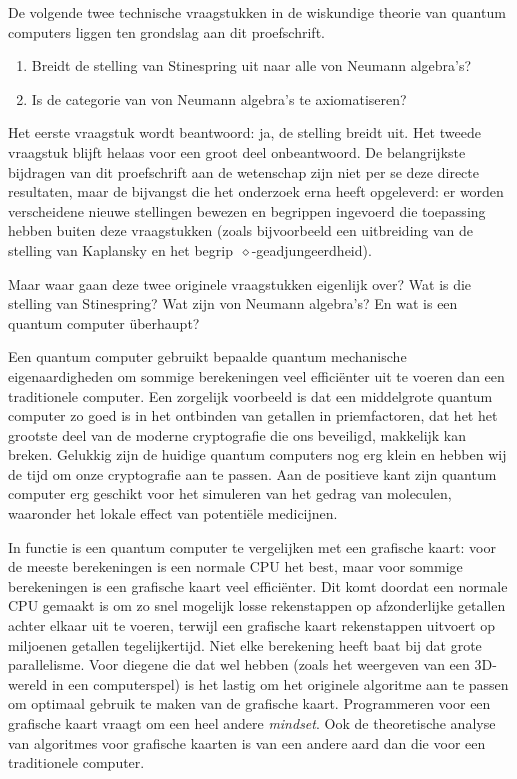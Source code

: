     
De volgende twee technische vraagstukken
    in de wiskundige theorie van quantum computers
    liggen ten grondslag aan dit proefschrift.
\begin{enumerate}
\item 
    Breidt de stelling van Stinespring uit naar
        alle von Neumann algebra's?
\item
    Is de categorie van von Neumann algebra's te axiomatiseren?
\end{enumerate}
Het eerste vraagstuk wordt beantwoord: ja, de stelling breidt uit.
Het tweede vraagstuk blijft helaas voor een groot deel onbeantwoord.
De belangrijkste bijdragen van dit proefschrift aan de wetenschap
    zijn niet per se deze directe resultaten,
    maar de bijvangst die het onderzoek erna heeft opgeleverd:
    er worden verscheidene nieuwe stellingen bewezen
        en begrippen ingevoerd
    die toepassing hebben buiten deze vraagstukken
    (zoals bijvoorbeeld een uitbreiding van de stelling
        van Kaplansky en het begrip~$\diamond$-geadjungeerdheid).

Maar waar gaan deze twee originele vraagstukken eigenlijk over?
Wat is die stelling van Stinespring?
Wat zijn von Neumann algebra's?
En wat is een quantum computer \"uberhaupt?

Een quantum computer gebruikt
       bepaalde quantum mechanische eigenaardigheden
    om sommige berekeningen veel effici\"enter uit
    te voeren dan een traditionele computer.
Een zorgelijk voorbeeld is
    dat een middelgrote quantum computer
    zo goed is in het ontbinden van getallen in priemfactoren,
    dat het het grootste deel van de moderne cryptografie die ons
    beveiligd, makkelijk kan breken.
Gelukkig zijn de huidige quantum computers nog erg klein
    en hebben wij de tijd om onze cryptografie aan te passen.
Aan de positieve kant zijn
    quantum computer erg geschikt voor het simuleren
    van het gedrag van moleculen,
    waaronder het lokale effect van potenti\"ele medicijnen.

In functie is een quantum computer te vergelijken met
        een grafische kaart:
    voor de meeste berekeningen is een normale CPU het best,
            maar voor sommige berekeningen
        is een grafische kaart veel effici\"enter.
Dit komt doordat een normale CPU gemaakt is om zo snel mogelijk
    losse rekenstappen op afzonderlijke getallen
    achter elkaar uit te voeren,
    terwijl een grafische kaart rekenstappen
    uitvoert op miljoenen getallen tegelijkertijd.
Niet elke berekening heeft baat bij dat grote parallelisme.
Voor diegene die dat wel hebben (zoals het
    weergeven van een 3D-wereld in een computerspel)
    is het lastig om het originele algoritme aan te passen
    om optimaal gebruik te maken van de grafische kaart.
    Programmeren voor een grafische kaart vraagt om een
    heel andere \emph{mindset}.
Ook de theoretische analyse van algoritmes voor grafische kaarten
    is van een andere aard dan die voor een traditionele computer.

